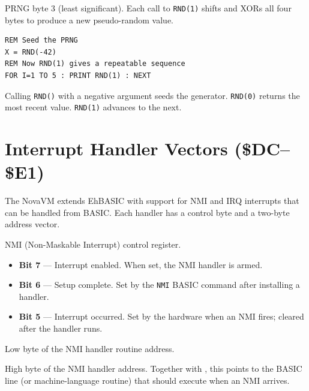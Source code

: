 
PRNG byte 3 (least significant).  Each call to \texttt{RND(1)} shifts and
XORs all four bytes to produce a new pseudo-random value.

\begin{lstlisting}
REM Seed the PRNG
X = RND(-42)
REM Now RND(1) gives a repeatable sequence
FOR I=1 TO 5 : PRINT RND(1) : NEXT
\end{lstlisting}

Calling \texttt{RND()} with a negative argument seeds the generator.
\texttt{RND(0)} returns the most recent value.  \texttt{RND(1)} advances
to the next.

\section{Interrupt Handler Vectors (\$DC--\$E1)}

The NovaVM extends EhBASIC with support for NMI and IRQ interrupts that can
be handled from BASIC.  Each handler has a control byte and a two-byte
address vector.


NMI (Non-Maskable Interrupt) control register.


\begin{itemize}
  \item \textbf{Bit 7} --- Interrupt enabled.  When set, the NMI handler is armed.
  \item \textbf{Bit 6} --- Setup complete.  Set by the \texttt{NMI} BASIC command
        after installing a handler.
  \item \textbf{Bit 5} --- Interrupt occurred.  Set by the hardware when an NMI
        fires; cleared after the handler runs.
\end{itemize}


Low byte of the NMI handler routine address.


High byte of the NMI handler address.  Together with , this points
to the BASIC line (or machine-language routine) that should execute when an
NMI arrives.


